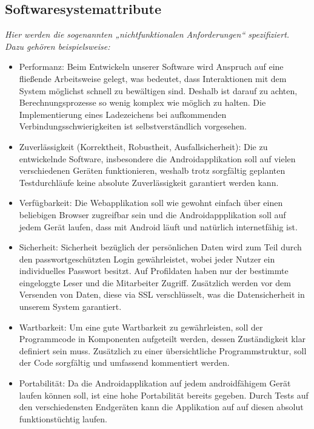 \documentclass[fontsize=12pt,paper=a4,twoside]{scrartcl}
\begin{document}
\subsection{Softwaresystemattribute}
  {\em Hier werden die sogenannten „nichtfunktionalen Anforderungen“
  spezifiziert. Dazu gehören beispielsweise:
  \begin{itemize}
    \item Performanz:
    Beim Entwickeln unserer Software wird Anspruch auf eine fließende
    Arbeitsweise gelegt, was bedeutet, dass Interaktionen mit dem 
    System möglichst schnell zu bewältigen sind. Deshalb ist darauf zu achten,
    Berechnungsprozesse so wenig komplex wie möglich zu halten. Die 
    Implementierung eines Ladezeichens bei aufkommenden Verbindungsschwierigkeiten 
    ist selbstverständlich vorgesehen.
    
    \item Zuverlässigkeit (Korrektheit, Robustheit, Ausfallsicherheit):
    Die zu entwickelnde Software, insbesondere die Androidapplikation soll auf vielen
    verschiedenen Geräten funktionieren, weshalb trotz sorgfältig geplanten
    Testdurchläufe keine absolute Zuverlässigkeit garantiert werden kann. 

    \item Verfügbarkeit:
    Die Webapplikation soll wie gewohnt einfach über einen beliebigen  Browser 
    zugreifbar sein und die Androidappplikation soll auf jedem Gerät laufen,
    dass mit Android läuft und natürlich internetfähig ist. 

    \item Sicherheit:
     Sicherheit bezüglich der persönlichen Daten wird zum Teil durch den 
     passwortgeschützten Login gewährleistet, wobei jeder Nutzer ein individuelles 
     Passwort besitzt. Auf Profildaten haben nur der bestimmte eingeloggte          
     Leser und die Mitarbeiter Zugriff. Zusätzlich werden vor dem Versenden von Daten, 
     diese via SSL verschlüsselt, was die Datensicherheit in unserem System 
     garantiert.
   
    \item Wartbarkeit:
    Um eine gute Wartbarkeit zu gewährleisten, soll der Programmcode in Komponenten
    aufgeteilt werden, dessen Zuständigkeit klar definiert sein muss. Zusätzlich 
    zu einer übersichtliche Programmstruktur, soll der Code sorgfältig und umfassend 
    kommentiert werden.
   
    \item Portabilität:
    Da die Androidapplikation auf jedem androidfähigem Gerät laufen können soll,
    ist eine hohe Portabilität bereits gegeben. Durch Tests auf den verschiedensten 
    Endgeräten kann die Applikation auf auf diesen absolut funktionstüchtig laufen.
  \end{itemize}
}
\end{document}
